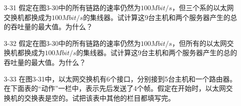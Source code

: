 \documentclass[a4paper,UTF8]{article}
\begin{document}
\begin{enumerate}
\item[3-31] 假定在图3-30中的所有链路的速率仍然为$100Mbit/s$，但三个系的以太网交换机都换成为$100Mbit/s$的集线器。试计算这9台主机和两个服务器产生的总的吞吐量的最大值。为什么？ 
\begin{solution}

\end{solution}

\item[3-32] 假定在图3-30中的所有链路的速率仍然为$100Mbit/s$，但所有的以太网交换机都换成为$100Mbit/s$的集线器。试计算这9台主机和两个服务器产生的总的吞吐量的最大值。为什么？ 
\begin{solution}

\end{solution}

\item[3-33] 在图3-31中，以太网交换机有6个接口，分别接到5台主机和一个路由器。在下面表的“动作”一栏中，表示先后发送了4个帧。假定在开始时，以太网交换机的交换表是空的。试把该表中其他的栏目都填写完。

\end{enumerate}
\end{document}
